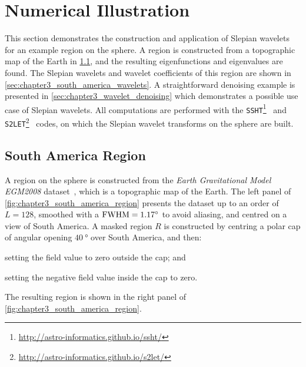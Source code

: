 \section{Numerical Illustration}\label{sec:chapter3_numerical_illustration}

This section demonstrates the construction and application of Slepian wavelets for an example region on the sphere.
A region is constructed from a topographic map of the Earth in \cref{sec:chapter3_south_america_region}, and the resulting eigenfunctions and eigenvalues are found.
The Slepian wavelets and wavelet coefficients of this region are shown in \cref{sec:chapter3_south_america_wavelets}.
A straightforward denoising example is presented in \cref{sec:chapter3_wavelet_denoising} which demonstrates a possible use case of Slepian wavelets.
All computations are performed with the \texttt{SSHT}\footnote{\url{http://astro-informatics.github.io/ssht/}}~\cite{McEwen2011} and \texttt{S2LET}\footnote{\url{http://astro-informatics.github.io/s2let/}}~\cite{Leistedt2013} codes, on which the Slepian wavelet transforms on the sphere are built.

\subsection{South America Region}\label{sec:chapter3_south_america_region}

A region on the sphere is constructed from the \emph{Earth Gravitational Model EGM2008} dataset~\cite{Pavlis2013}, which is a topographic map of the Earth.
The left panel of \cref{fig:chapter3_south_america_region} presents the dataset up to an order of \(L=128\), smoothed with a \(\text{FWHM}=\SI{1.17}{\degree}\) to avoid aliasing, and centred on a view of South America.
A masked region \(R\) is constructed by centring a polar cap of angular opening \(\SI{40}{\degree}\) over South America, and then:
%
\begin{inparaenum}[(i)]
	\item setting the field value to zero outside the cap; and
	\item setting the negative field value inside the cap to zero.
\end{inparaenum}
%
The resulting region is shown in the right panel of \cref{fig:chapter3_south_america_region}.

